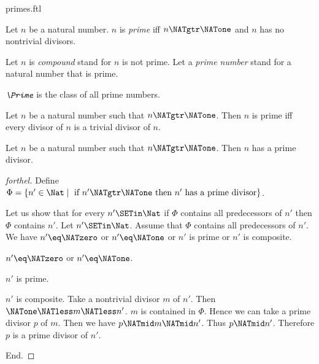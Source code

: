 \documentclass{naproche-library}
\begin{document}
\begin{smodule}[title=Prime Numbers]{primes.ftl}

\begin{definition}[forthel,id=ARITHMETIC_10_5450464558579712]
  Let $n$ be a natural number.
  $n$ is \emph{prime} iff $n \NATgtr \NATone$ and $n$ has no nontrivial divisors.

  Let $n$ is \emph{compound} stand for $n$ is not prime.
  Let a \emph{prime number} stand for a natural number that is prime.
\end{definition}

\begin{definition}[forthel,id=ARITHMETIC_10_3834705971511296]
  $\emph{\Prime}$ is the class of all prime numbers.
\end{definition}

\begin{proposition}[forthel,id=ARITHMETIC_10_7801379464675328]
  Let $n$ be a natural number such that $n \NATgtr \NATone$.
  Then $n$ is prime iff every divisor of $n$ is a trivial divisor of $n$.
\end{proposition}

\begin{proposition}[forthel,id=ARITHMETIC_10_3606185106210816]
  Let $n$ be a natural number such that $n \NATgtr \NATone$.
  Then $n$ has a prime divisor.
\end{proposition}
\begin{proof}[forthel]
  Define $\Phi = \{ n' \in \Nat \mid\text{ if }n' \NATgtr \NATone\text{ then }n'\text{ has a prime divisor}\}$.

  Let us show that for every $n' \SETin \Nat$ if $\Phi$ contains all
  predecessors of $n'$ then $\Phi$ contains $n'$.
    Let $n' \SETin \Nat$.
    Assume that $\Phi$ contains all predecessors of $n'$.
    We have $n' \eq \NATzero$ or $n' \eq \NATone$ or $n'$ is prime or $n'$ is composite.

    \begin{case}{$n' \eq \NATzero$ or $n' \eq \NATone$.} \end{case}

    \begin{case}{$n'$ is prime.} \end{case}

    \begin{case}{$n'$ is composite.}
      Take a nontrivial divisor $m$ of $n'$.
      Then $\NATone \NATless m \NATless n'$.
      $m$ is contained in $\Phi$.
      Hence we can take a prime divisor $p$ of $m$.
      Then we have $p \NATmid m \NATmid n'$.
      Thus $p \NATmid n'$.
      Therefore $p$ is a prime divisor of $n'$.
    \end{case}
  End.


\end{proof}
\end{smodule}
\end{document}
